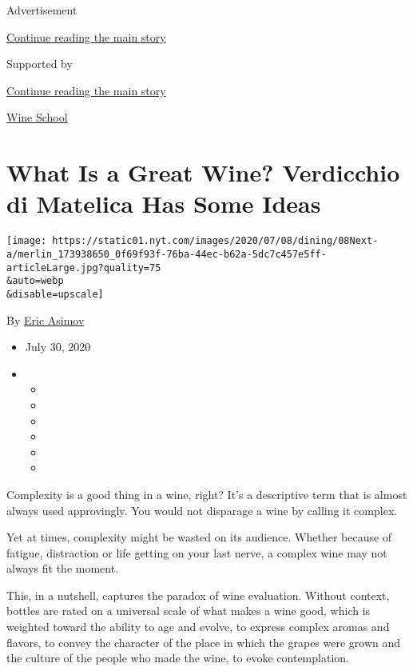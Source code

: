 Advertisement

\protect\hyperlink{after-top}{Continue reading the main story}

Supported by

\protect\hyperlink{after-sponsor}{Continue reading the main story}

\href{/column/wine-school}{Wine School}

\hypertarget{what-is-a-great-wine-verdicchio-di-matelica-has-some-ideas}{%
\section{What Is a Great Wine? Verdicchio di Matelica Has Some
Ideas}\label{what-is-a-great-wine-verdicchio-di-matelica-has-some-ideas}}

\texttt{[image: https://static01.nyt.com/images/2020/07/08/dining/08Next-a/merlin\_173938650\_0f69f93f-76ba-44ec-b62a-5dc7c457e5ff-articleLarge.jpg?quality=75\\\&auto=webp\\\&disable=upscale]}

By \href{https://www.nytimes.com/by/eric-asimov}{Eric Asimov}

\begin{itemize}
\item
  July 30, 2020
\item
  \begin{itemize}
  \item
  \item
  \item
  \item
  \item
  \item
  \end{itemize}
\end{itemize}

Complexity is a good thing in a wine, right? It's a descriptive term
that is almost always used approvingly. You would not disparage a wine
by calling it complex.

Yet at times, complexity might be wasted on its audience. Whether
because of fatigue, distraction or life getting on your last nerve, a
complex wine may not always fit the moment.

This, in a nutshell, captures the paradox of wine evaluation. Without
context, bottles are rated on a universal scale of what makes a wine
good, which is weighted toward the ability to age and evolve, to express
complex aromas and flavors, to convey the character of the place in
which the grapes were grown and the culture of the people who made the
wine, to evoke contemplation.

